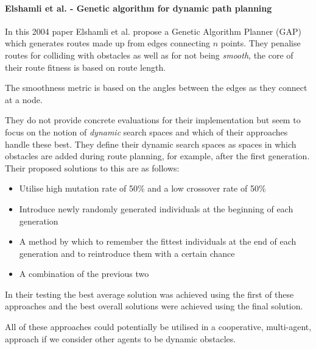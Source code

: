 \paragraph{Elshamli et al. - Genetic algorithm for dynamic path planning}\cite{elshamliGeneticAlgorithmDynamic2004}

In this 2004 paper Elshamli et al. propose a Genetic Algorithm Planner (GAP) which generates routes made up from edges connecting $n$ points. They penalise routes for colliding with obstacles as well as for not being \textit{smooth}, the core of their route fitness is based on route length.

The smoothness metric is based on the angles between the edges as they connect at a node.

They do not provide concrete evaluations for their implementation but seem to focus on the notion of \textit{dynamic} search spaces and which of their approaches handle these best. They define their dynamic search spaces as spaces in which obstacles are added during route planning, for example, after the first generation. Their proposed solutions to this are as follows:

\begin{itemize}
  \item Utilise high mutation rate of 50\% and a low crossover rate of 50\%
  \item Introduce newly randomly generated individuals at the beginning of each generation
  \item A method by which to remember the fittest individuals at the end of each generation and to reintroduce them with a certain chance
  \item A combination of the previous two
\end{itemize}

In their testing the best average solution was achieved using the first of these approaches and the best overall solutions were achieved using the final solution.

All of these approaches could potentially be utilised in a cooperative, multi-agent, approach if we consider other agents to be dynamic obstacles.

